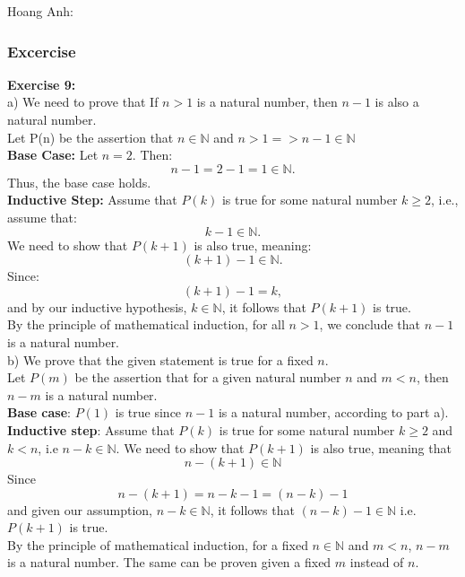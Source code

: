 Hoang Anh:

\subsubsection{Excercise}
\noindent 
\textbf{Exercise 9:}\\
a) We need to prove that If $n > 1$ is a natural number, then $n - 1$ is also a natural number.\\
Let P(n) be the assertion that $n \in \mathbb{N}$ and $n > 1 => n - 1 \in \mathbb{N}$\\
\textbf{Base Case:} Let $n = 2$. Then:
\[
n - 1 = 2 - 1 = 1 \in \mathbb{N}.
\]
Thus, the base case holds.\\
\textbf{Inductive Step:} Assume that $P(k)$ is true for some natural number $k \geq 2$, i.e., assume that:
\[
k - 1 \in \mathbb{N}.
\]
We need to show that $P(k+1)$ is also true, meaning:
\[
(k+1) - 1 \in \mathbb{N}.
\]
Since:
\[
(k+1) - 1 = k,
\]
and by our inductive hypothesis, $k \in \mathbb{N}$, it follows that $P(k+1)$ is true.\\
By the principle of mathematical induction, for all $n > 1$, we conclude that $n - 1$ is a natural number.\\
b) We prove that the given statement is true for a fixed $n$.\\
Let $P(m)$ be the assertion that for a given natural number $n$ and $m < n$, then $n - m$ is a natural number.\\
\textbf{Base case}: $P(1)$ is true since $n - 1$ is a natural number, according to part a).\\
\textbf{Inductive step}: Assume that $P(k)$ is true for some natural number $k \geq 2$ and $k < n$, i.e $n - k \in \mathbb{N}$. We need to show that $P(k + 1)$ is also true, meaning that
$$
n - (k + 1) \in \mathbb{N}
$$
Since 
$$
n - (k + 1) = n - k - 1 = (n - k) - 1
$$
and given our assumption, $n - k \in \mathbb{N}$, it follows that $(n - k) - 1 \in \mathbb{N}$ i.e. $P(k + 1)$ is true.\\
By the principle of mathematical induction, for a fixed $n \in \mathbb{N}$ and $m < n$, $n - m$ is a natural number. The same can be proven given a fixed $m$ instead of $n$.
